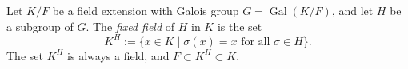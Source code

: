 \documentclass{article}
\begin{document}
Let $K/F$ be a field extension with Galois group $G = \operatorname{Gal}(K/F)$, and let $H$ be a subgroup of $G$. The {\em fixed field} of $H$ in $K$ is the set
$$
K^H := \{ x \in K \mid \sigma(x) = x\text{ for all }\sigma \in H \}.
$$
The set $K^H$ is always a field, and $F \subset K^H \subset K$.
\end{document}
